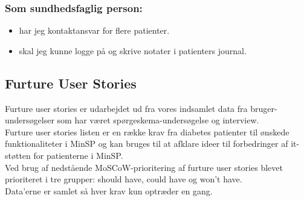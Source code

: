 \subsubsection*{Som sundhedsfaglig person:}
\begin{itemize}
\item har jeg kontaktansvar for flere patienter.
\item skal jeg kunne logge på og skrive notater i patienters journal.
\end{itemize}
\subsection{Furture User Stories}
Furture user stories er udarbejdet ud fra vores indsamlet data fra bruger-undersøgelser som har været spørgeskema-undersøgelse og interview.\\
Furture user stories listen er en række krav fra diabetes patienter til ønskede funktionaliteter i MinSP og kan bruges til at afklare ideer til forbedringer af it-støtten for patienterne i MinSP.\\
Ved brug af nedstående MoSCoW-prioritering af furture user stories blevet prioriteret i tre grupper: should have, could have og won't have.\\
Data'erne er samlet så hver krav kun optræder en gang. 
